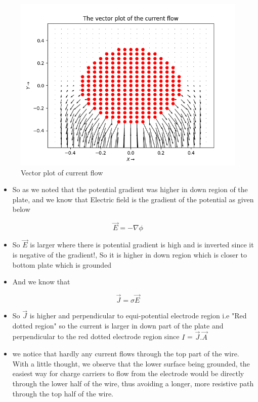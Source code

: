\documentclass[11pt, a4paper]{article}
\begin{document}
  \begin{figure}[!tbh]
   \centering
   \includegraphics[scale=0.8]{Ass5_Figure_9.png}  
   \caption{Vector plot of current flow}
  \end{figure}
  

  \begin{itemize}
  \item
    So as we noted that the potential gradient was higher in down region
    of the plate, and we know that Electric field is the gradient of the
    potential as given below
  \end{itemize}
  
  \begin{equation}
  \vec{E} = -\nabla{\phi}
     \end{equation}
  
  \begin{itemize}
  \item
    So \(\vec{E}\) is larger where there is potential gradient is high and
    is inverted since it is negative of the gradient!, So it is higher in
    down region which is closer to bottom plate which is grounded
  \item
    And we know that
  \end{itemize}
  
  \begin{equation}
  \vec{J} = \sigma\vec{E}
     \end{equation}
  
  \begin{itemize}
  \item
    So \(\vec{J}\) is higher and perpendicular to equi-potential electrode
    region i.e "Red dotted region" so the current is larger in down part
    of the plate and perpendicular to the red dotted electrode region
    since \(I\) = \(\vec{J}.\vec{A}\)
  \item
   	we notice that hardly any current flows through  the  top  part  of  the  wire.   With  a  little  thought,  we  observe  that the lower surface being grounded, the easiest way for charge carriers to flow from the electrode would be directly through the lower half of the wire, thus avoiding a longer, more resistive path through the top half of the wire.
  \end{itemize}
  
\end{document}
